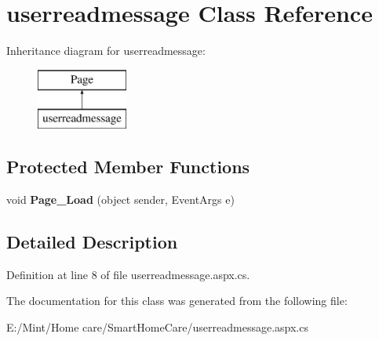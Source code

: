 \hypertarget{classuserreadmessage}{\section{userreadmessage Class Reference}
\label{classuserreadmessage}
}
Inheritance diagram for userreadmessage\-:\begin{figure}[H]
\begin{center}
\leavevmode
\includegraphics[height=2.000000cm]{classuserreadmessage}
\end{center}
\end{figure}
\subsection*{Protected Member Functions}
\begin{DoxyCompactItemize}
\item 
\hypertarget{classuserreadmessage_ad26c0053356993eafb3be444be1bf391}{void {\bfseries Page\-\_\-\-Load} (object sender, Event\-Args e)}\label{classuserreadmessage_ad26c0053356993eafb3be444be1bf391}

\end{DoxyCompactItemize}


\subsection{Detailed Description}


Definition at line 8 of file userreadmessage.\-aspx.\-cs.



The documentation for this class was generated from the following file\-:\begin{DoxyCompactItemize}
\item 
E\-:/\-Mint/\-Home care/\-Smart\-Home\-Care/userreadmessage.\-aspx.\-cs\end{DoxyCompactItemize}
